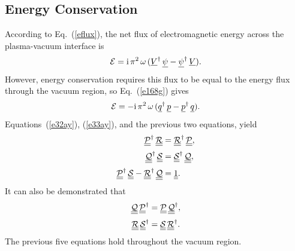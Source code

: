 \documentclass[12pt,prb,aps]{revtex4-1}
\begin{document}
\subsection{Energy Conservation}
According to Eq.~(\ref{eflux}), the net flux of electromagnetic energy across the plasma-vacuum interface  is
\begin{equation}
{\cal E} = {\rm i}\,\pi^2\,\omega\, (\underline{V}^\dag\,\underline{\psi}- \underline{\psi}^\dag\,\underline{V}).
\end{equation}
However, energy conservation requires this flux to be equal  to the energy flux through the vacuum region, so Eq.~(\ref{e168g}) gives
\begin{equation}\label{e39x}
{\cal E} =-  {\rm i}\,\pi^2\,\omega\,(\underline{q}^\dag\,\underline{p}-\underline{p}^\dag\,\underline{q}).
\end{equation}
Equations~(\ref{e32ay}), (\ref{e33ay}), and the previous two equations, yield\,\cite{tj1}
\begin{align}\label{e41zx}
\underline{\underline{\cal P}}^\dag\,\underline{\underline{\cal R}}&= \underline{\underline{\cal R}}^\dag\,\underline{\underline{\cal P}},\\[0.5ex]
\underline{\underline{\cal Q}}^\dag\,\underline{\underline{\cal S}}&= \underline{\underline{\cal S}}^\dag\,\underline{\underline{\cal Q}},\label{e42zx}\\[0.5ex]
\underline{\underline{\cal P}}^\dag\,\underline{\underline{\cal S}}- \underline{\underline{\cal R}}^\dag\,\underline{\underline{\cal Q}}&=\underline{\underline{1}}.\label{e43zx}
\end{align}
 It can also be demonstrated that 
\begin{align}\label{e46}
\underline{\underline{\cal Q}}\,\underline{\underline{\cal P}}^\dag&= \underline{\underline{\cal P}}\,\underline{\underline{\cal Q}}^\dag,\\[0.5ex]
\underline{\underline{\cal R}}\,\underline{\underline{\cal S}}^\dag&= \underline{\underline{\cal S}}\,\underline{\underline{\cal R}}^\dag.\label{e47x}
\end{align}
The previous five equations hold throughout the vacuum region. 
\end{document}
